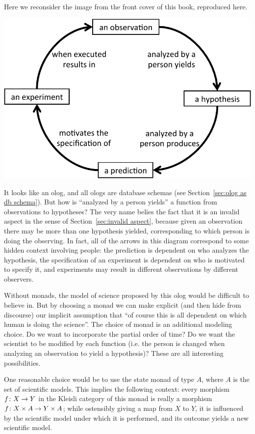 \documentclass[CT4S-EN-RU]{subfiles}
\begin{document}
\begin{remarkRUS}\label{rem:state monad}
\end{remarkRUS}

\begin{exampleENG}\label{ex:scientific method}
Here we reconsider the image from the front cover of this book, reproduced here.
\begin{center}
\includegraphics[width=.8\textwidth]{ScientificMethod}
\end{center}

It looks like an olog, and all ologs are database schemas (see Section~\ref{sec:olog as db schema}). But how is “analyzed by a person yields” a function from observations to hypotheses? The very name belies the fact that it is an invalid aspect in the sense of Section~\ref{sec:invalid aspect}, because given an observation there may be more than one hypothesis yielded, corresponding to which person is doing the observing. In fact, all of the arrows in this diagram correspond to some hidden context involving people: the prediction is dependent on who analyzes the hypothesis, the specification of an experiment is dependent on who is motivated to specify it, and experiments may result in different observations by different observers. 

Without monads, the model of science proposed by this olog would be difficult to believe in. But by choosing a monad we can make explicit (and then hide from discourse) our implicit assumption that “of course this is all dependent on which human is doing the science”. The choice of monad is an additional modeling choice. Do we want to incorporate the partial order of time? Do we want the scientist to be modified by each function (i.e. the person is changed when analyzing an observation to yield a hypothesis)? These are all interesting possibilities. 

One reasonable choice would be to use the state monad of type $A$, where $A$ is the set of scientific models. This implies the following context: every morphism $f\colon X\rightarrow Y$ in the Kleisli category of this monad is really a morphism $f\colon X\times A\rightarrow Y\times A$; while ostensibly giving a map from $X$ to $Y$, it is influenced by the scientific model under which it is performed, and its outcome yields a new scientific model. 


\end{exampleENG}
\end{document}
